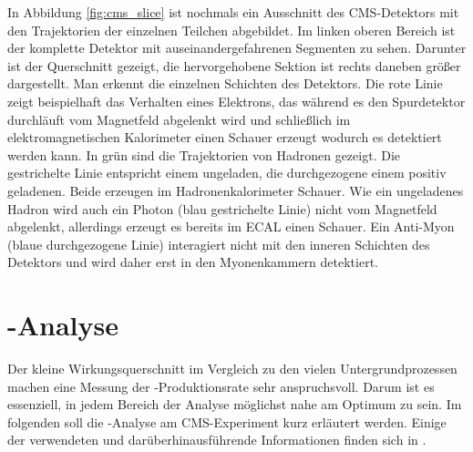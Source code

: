 In Abbildung \ref{fig:cms_slice} ist nochmals ein Ausschnitt des CMS-Detektors mit den Trajektorien der einzelnen Teilchen abgebildet. Im linken oberen Bereich ist der komplette Detektor mit auseinandergefahrenen Segmenten zu sehen. Darunter ist der Querschnitt gezeigt, die hervorgehobene Sektion ist rechts daneben gr\"o\ss er dargestellt. Man erkennt die einzelnen Schichten des Detektors. Die rote Linie zeigt beispielhaft das Verhalten eines Elektrons, das w\"ahrend es den Spurdetektor durchl\"auft vom Magnetfeld abgelenkt wird und schlie\ss lich im elektromagnetischen Kalorimeter einen Schauer erzeugt wodurch es detektiert werden kann. In gr\"un sind die Trajektorien von Hadronen gezeigt. Die gestrichelte Linie entspricht einem ungeladen, die durchgezogene einem positiv geladenen. Beide erzeugen im Hadronenkalorimeter Schauer. Wie ein ungeladenes Hadron wird auch ein Photon (blau gestrichelte Linie) nicht vom Magnetfeld abgelenkt, allerdings erzeugt es bereits im ECAL einen Schauer. Ein Anti-Myon (blaue durchgezogene Linie) interagiert nicht mit den inneren Schichten des Detektors und wird daher erst in den Myonenkammern detektiert.

\section{\ttH-Analyse}
\label{ch:Experiment:sec:ttH}

Der kleine Wirkungsquerschnitt im Vergleich zu den vielen Untergrundprozessen machen eine Messung der \ttH-Produktionsrate sehr anspruchsvoll. Darum ist es essenziell, in jedem Bereich der Analyse m\"oglichst nahe am Optimum zu sein. Im folgenden soll die \ttH-Analyse am CMS-Experiment kurz erl\"autert werden. Einige der verwendeten und dar\"uberhinausf\"uhrende Informationen finden sich in \cite{Khachatryan:2014qaa}.

